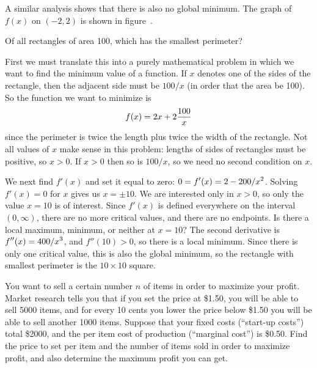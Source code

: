 A similar analysis shows that there is also no global minimum.
The
graph of $f(x)$ on $(-2,2)$ is shown in 
figure~.
\endexample

\example
Of all rectangles of area 100, which has the smallest perimeter?

First we must translate this into a purely mathematical problem in
which we want to find the minimum value of a function.
If $x$ denotes one of the sides of the rectangle, then the adjacent side
must be $100/x$ (in order that the area be 100).  So the function we want
to minimize is 
$$
  f(x)=2x+2{100\over x}
$$
since the perimeter is twice the length plus twice the width of the
rectangle. Not all values of $x$ make sense in this problem: lengths
of sides of rectangles must be positive, so $x>0$. If $x>0$ then so is
$100/x$, so we need no second condition on $x$.

We next find $f'(x)$ and set it equal to zero: $\displaystyle 0=f'(x)=2-200/x^2$.
Solving $f'(x)=0$ for $x$ gives us $x=\pm 10$. We are interested only
in $x>0$, so only the value $x=10$ is of interest. Since $f'(x)$ is
defined everywhere on the interval $(0,\infty)$, there are no more
critical values, and there are no endpoints. Is there a local maximum,
minimum, or neither at $x=10$? The second derivative is
$\displaystyle f''(x)=400/x^3$, and $f''(10)>0$, so there is a local minimum. Since
there is only one critical value, this is also the global minimum, so the
rectangle with smallest perimeter is the $10\times10$ square.
\endexample

\example
You want to sell a certain number $n$ of items in order to maximize your
profit.  Market research tells you that if you set the price at \$1.50, you
will be able to sell 5000 items, and for every 10 cents you lower the price
below \$1.50 you will be able to sell another 1000 items.  Suppose that
your fixed costs (``start-up costs'') total \$2000, and the per item cost
of production (``marginal cost'') is \$0.50.  Find the price to set per
item and the number of items sold in order to maximize profit, and also
determine the maximum profit you can get.

